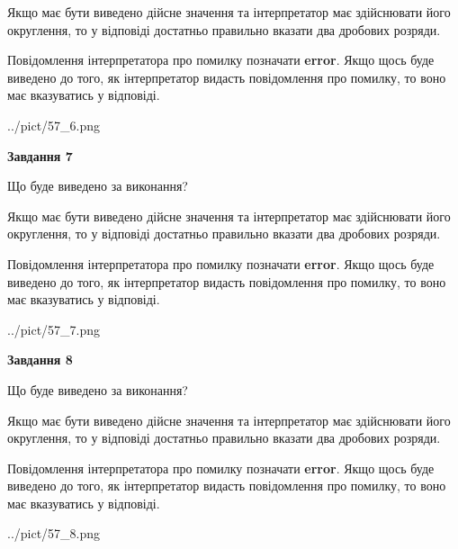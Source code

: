 \documentclass[12pt, ukrainian]{article}
\begin{document}
{\begin {Large}
Якщо має бути виведено дійсне значення та інтерпретатор має здійснювати його округлення, 
то у відповіді достатньо правильно вказати два дробових розряди.

Повідомлення інтерпретатора про помилку позначати \textbf{error}.
Якщо щось буде виведено до того, як інтерпретатор видасть повідомлення про помилку, 
то воно має вказуватись у відповіді. \par

\begin{center}
	{../pict/57_6.png}
\end{center}
\newpage

{\begin {center}\textbf{Завдання 7}\end {center}}\par
Що буде виведено за виконання? \par

Якщо має бути виведено дійсне значення та інтерпретатор має здійснювати його округлення, 
то у відповіді достатньо правильно вказати два дробових розряди.

Повідомлення інтерпретатора про помилку позначати \textbf{error}.
Якщо щось буде виведено до того, як інтерпретатор видасть повідомлення про помилку, 
то воно має вказуватись у відповіді. \par

\begin{center}
	{../pict/57_7.png}
\end{center}
\newpage

{\begin {center}\textbf{Завдання 8}\end {center}}\par
Що буде виведено за виконання? \par

Якщо має бути виведено дійсне значення та інтерпретатор має здійснювати його округлення, 
то у відповіді достатньо правильно вказати два дробових розряди.

Повідомлення інтерпретатора про помилку позначати \textbf{error}.
Якщо щось буде виведено до того, як інтерпретатор видасть повідомлення про помилку, 
то воно має вказуватись у відповіді. \par

\begin{center}
	{../pict/57_8.png}
\end{center}
\newpage


\end{Large}}
\end{document}
